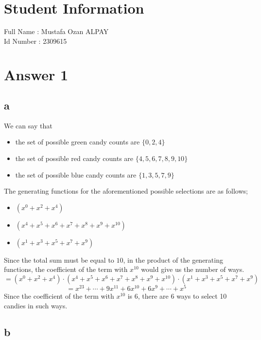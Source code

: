 \documentclass[12pt]{article}
\begin{document}
\section*{Student Information } 
Full Name : Mustafa Ozan ALPAY \\
Id Number : 2309615 \\

\section*{Answer 1}
\subsection*{a} 
We can say that 
\begin{itemize}
    \item the set of possible green candy counts are $\{ 0, 2, 4 \} $
    \item the set of possible red candy counts are $\{ 4, 5, 6, 7, 8, 9, 10 \} $
    \item the set of possible blue candy counts are $\{ 1, 3, 5, 7, 9 \} $
\end{itemize}
The generating functions for the aforementioned possible selections are as follows;
\begin{itemize}
    \item $(x^0 + x^2 + x^4)$ 
    \item $(x^4 + x^5 + x^6 + x^7 + x^8 + x^9 + x^{10})$
    \item $(x^1 + x^3 + x^5 + x^7 + x^9)$
\end{itemize}
Since the total sum must be equal to $10$, in the product of the generating functions, the coefficient of the term with $x^{10}$ would give us the number of ways.
$$ = (x^0 + x^2 + x^4) \cdot (x^4 + x^5 + x^6 + x^7 + x^8 + x^9 + x^{10}) \cdot (x^1 + x^3 + x^5 + x^7 + x^9) $$
$$ = x^{23} + \dotsb + 9x^{11} +
6x^{10} + 6x^{9} + \dotsb + x^{5}  $$
Since the coefficient of the term with $x^{10}$ is 6, there are 6 ways to select 10 candies in such ways.
                
\subsection*{b}
\end{document}
